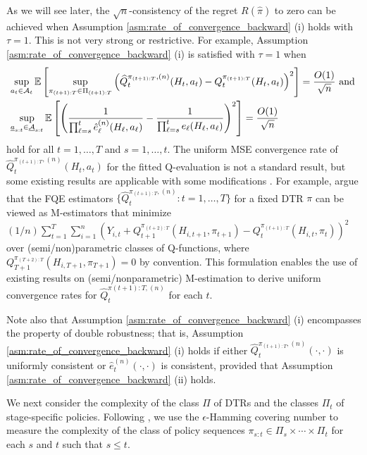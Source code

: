 \medskip{}


As we will see later, the $\sqrt{n}$-consistency of the regret  $R(\hat{\pi})$ to zero can be achieved when Assumption \ref{asm:rate_of_convergence_backward} (i) holds with $\tau=1$. This is not very strong or restrictive. For example, Assumption \ref{asm:rate_of_convergence_backward} (i) is satisfied with $\tau = 1$ when
\begin{align*}
&\sup_{a_{t} \in \mathcal{A}_{t}}  \mathbb{E}\left[\sup_{\pi_{(t+1):T} \in \Pi_{(t+1):T}}\left(\widehat{Q}_{t}^{\pi_{(t+1):T},(n)}(H_{t},a_{t}) - Q_{t}^{\pi_{(t+1):T}}(H_{t},a_{t})\right)^{2}\right] = \frac{O(1)}{\sqrt{n}}\mbox{\ and\ }\\
    &\sup_{\underline{a}_{s:t} \in \underline{\mathcal{A}}_{s:t}} \mathbb{E}\left[\left(\frac{1}{\prod_{\ell=s}^{t}\hat{e}_{\ell}^{(n)}(H_{\ell},a_{\ell})} - \frac{1}{\prod_{\ell=s}^{t}e_{\ell}(H_{\ell},a_{\ell})} \right)^{2}\right] = \frac{O(1)}{\sqrt{n}}
\end{align*}
hold for all $t=1,\ldots,T$ and $s=1,\ldots,t$. The uniform MSE convergence rate of $\widehat{Q}_{t}^{\pi_{(t+1):T},(n)}(H_{t},a_{t})$ for the fitted Q-evaluation is not a standard result, but some existing results are applicable with some modifications \citep[e.g.,][]{Zhang_et_al_2018,Kallus_Uehara_2020}.
For example, \cite{Kallus_Uehara_2020} argue that the FQE estimators $\{\widehat{Q}_{t}^{\pi_{(t+1):T},(n)}:t=1,\ldots,T\}$ for a fixed DTR $\pi$ can be viewed as M-estimators that minimize $(1/n)\sum_{t=1}^{T}\sum_{i=1}^{n}\left(Y_{i,t} + Q_{t+1}^{\pi_{(t+2):T}}(H_{i,t+1},\pi_{t+1}) - Q_{t}^{\pi_{(t+1):T}}(H_{i,t},\pi_{t}) \right)^2$ over (semi/non)parametric classes of Q-functions, where $Q_{T+1}^{\pi_{(T+2):T}}(H_{i,T+1},\pi_{T+1})=0$ by convention. This formulation enables the use of existing results on (semi/nonparametric) M-estimation to derive uniform convergence rates for $\widehat{Q}_{t}^{\pi{(t+1):T},(n)}$ for each $t$.

Note also that Assumption \ref{asm:rate_of_convergence_backward} (i) encompasses the property of double robustness; that is, Assumption \ref{asm:rate_of_convergence_backward} (i) holds if either $\widehat{Q}_{t}^{\pi_{(t+1):T},(n)}(\cdot,\cdot)$ is uniformly consistent or $\hat{e}_{t}^{(n)}(\cdot,\cdot)$ is consistent, provided that Assumption \ref{asm:rate_of_convergence_backward} (ii) holds.


We next consider the complexity of the class $\Pi$ of DTRs and the classes $\Pi_t$ of stage-specific policies. Following \cite{zhou2022offline}, we use the $\epsilon$-Hamming covering number to measure the complexity of the class of policy sequences $\pi_{s:t} \in \Pi_{s}\times \cdots \times \Pi_{t}$ for each $s$ and $t$ such that $s \leq t$. 

